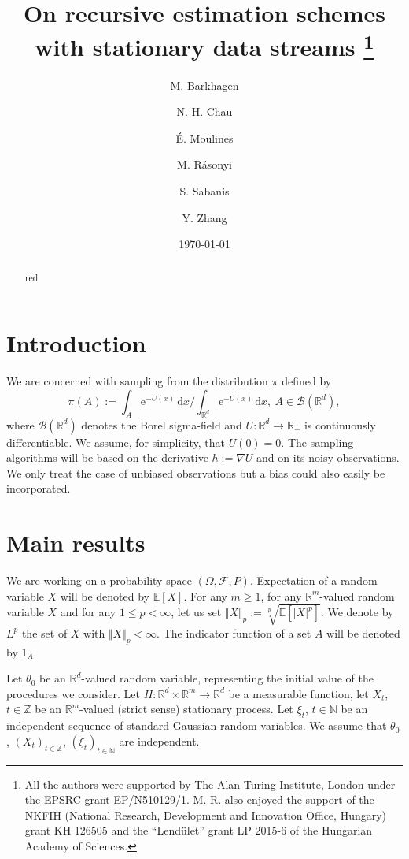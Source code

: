 \documentclass[a4paper,draft]{article}
\def\rmd{\mathrm{d}}
\def\rme{\mathrm{e}}
\def\PE{\mathbb{E}}
\begin{document}
\title{On recursive estimation schemes\\ with stationary data streams
\thanks{All the authors
were supported
by The Alan Turing Institute, London under the EPSRC grant EP/N510129/1.
M. R. also enjoyed the support of the NKFIH (National Research, Development and Innovation Office, Hungary)
grant KH 126505 and the ``Lend\"ulet'' grant LP 2015-6 of the
Hungarian Academy of Sciences.}}

\author{M. Barkhagen \and N. H. Chau \and \'E. Moulines \and
M. R\'asonyi \and S. Sabanis \and Y. Zhang}

\date{\today}

\maketitle

\begin{abstract}
red
\end{abstract}

\section{Introduction}

We are concerned with sampling from the distribution $\pi$ defined by
$$
\pi(A):=\int_A \rme^{-U(x)}\, \rmd x/\int_{\mathbb{R}^d} \rme^{-U(x)}\, \rmd x,\
A\in\mathcal{B}(\mathbb{R}^d),
$$
where $\mathcal{B}(\mathbb{R}^d)$ denotes the Borel sigma-field
and $U:\mathbb{R}^d\to\mathbb{R}_+$ is continuously
differentiable. We assume, for simplicity,
that $U(0)=0$. The sampling algorithms will be based on
the derivative $h:=\nabla U$ and on its noisy observations.
We only treat the case of unbiased observations but a bias
could also easily be incorporated.

\section{Main results}

We are working on a probability space $(\Omega,\mathcal{F},P)$.
Expectation of
a random variable $X$ will be denoted by $\PE[X]$.
For any $m\geq 1$, for any $\mathbb{R}^m$-valued random variable $X$ and for any $1\leq p<\infty$, let us set
$\Vert X\Vert_p:=\sqrt[p]{\PE[|X|^p]}$. We denote by $L^p$ the set of $X$ with $\Vert X\Vert_p<\infty$.
The indicator function of a set $A$ will be denoted by $1_A$.


Let $\theta_0$ be an $\mathbb{R}^d$-valued random variable, representing
the initial value of the procedures we consider.
Let $H:\mathbb{R}^d\times\mathbb{R}^m\to\mathbb{R}^d$ be a measurable
function, let $X_t$, $t\in\mathbb{Z}$ be an $\mathbb{R}^m$-valued (strict sense) stationary process.
Let $\xi_t$, $t\in\mathbb{N}$ be an independent
sequence of standard Gaussian random variables. We assume that $\theta_0$, $(X_t)_{t\in\mathbb{Z}}$,
$(\xi_t)_{t\in\mathbb{N}}$ are independent.
\end{document}

